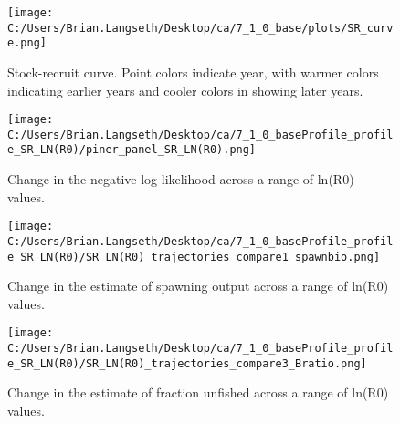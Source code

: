 \documentclass[11pt,
  english,
  letterpaper,
]{article}
\begin{document}

\begin{figure}
\centering
\texttt{[image: C:/Users/Brian.Langseth/Desktop/ca/7\_1\_0\_base/plots/SR\_curve.png]}
\caption{Stock-recruit curve. Point colors indicate year, with warmer colors indicating earlier years and cooler colors in showing later years.\label{fig:bh-curve}}
\end{figure}

\tagmcend\tagstructend


\begin{figure}
\centering
\texttt{[image: C:/Users/Brian.Langseth/Desktop/ca/7\_1\_0\_baseProfile\_profile\_SR\_LN(R0)/piner\_panel\_SR\_LN(R0).png]}
\caption{Change in the negative log-likelihood across a range of ln(R0) values.\label{fig:r0-profile}}
\end{figure}

\tagmcend\tagstructend


\begin{figure}
\centering
\texttt{[image: C:/Users/Brian.Langseth/Desktop/ca/7\_1\_0\_baseProfile\_profile\_SR\_LN(R0)/SR\_LN(R0)\_trajectories\_compare1\_spawnbio.png]}
\caption{Change in the estimate of spawning output across a range of ln(R0) values.\label{fig:r0-ssb}}
\end{figure}

\tagmcend\tagstructend


\begin{figure}
\centering
\texttt{[image: C:/Users/Brian.Langseth/Desktop/ca/7\_1\_0\_baseProfile\_profile\_SR\_LN(R0)/SR\_LN(R0)\_trajectories\_compare3\_Bratio.png]}
\caption{Change in the estimate of fraction unfished across a range of ln(R0) values.\label{fig:r0-depl}}
\end{figure}
\end{document}
